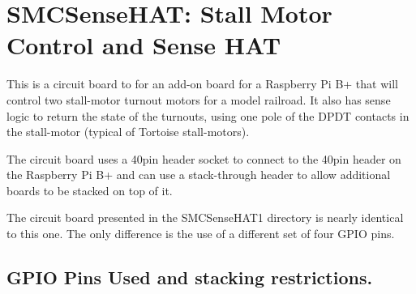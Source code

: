 %
%
%
%
% 
%
%
%
%
%
% 
%

\chapter{SMCSenseHAT: Stall Motor Control and Sense HAT}

This is a circuit board to for an add-on board for a Raspberry Pi B+ that will
control  two  stall-motor  turnout  motors for a model  railroad.  It also has
sense  logic to return the state of the  turnouts,  using one pole of the DPDT
contacts in the stall-motor (typical of Tortoise stall-motors).

The circuit board uses a 40pin header socket to connect to the 40pin header on
the  Raspberry Pi B+ and can use a  stack-through  header to allow  additional
boards to be stacked on top of it.

The circuit board presented in the SMCSenseHAT1 directory is nearly identical 
to this one.  The only difference is the use of a different set of four GPIO 
pins.


\section{GPIO Pins Used and stacking restrictions.}

